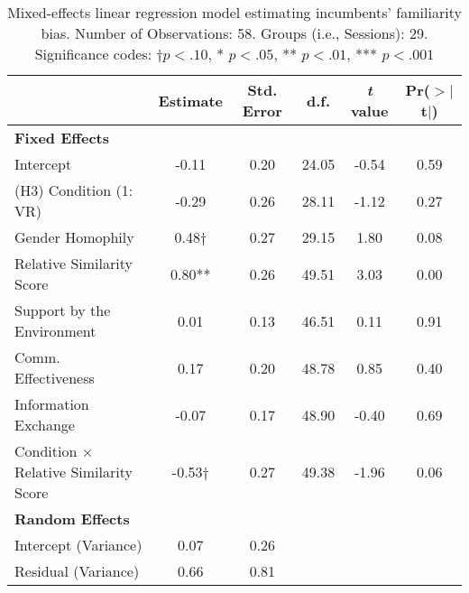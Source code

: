 \begin{table}[ht]
\centering
\small
\begin{tabular}{lccccc}
  \hline
 & Estimate & Std. Error & d.f. & \textit{t} value & Pr($>$$|$t$|$) \\ 
  \hline
  \textbf{Fixed Effects} & & & & & \\
  Intercept & -0.11 & 0.20 & 24.05 & -0.54 & 0.59 \\ 
  (H3) Condition (1: VR) & -0.29 & 0.26 & 28.11 & -1.12 & 0.27 \\ 
  Gender Homophily & 0.48$\dagger$ & 0.27 & 29.15 & 1.80 & 0.08 \\ 
  Relative Similarity Score & 0.80** & 0.26 & 49.51 & 3.03 & 0.00 \\ 
  Support by the Environment & 0.01 & 0.13 & 46.51 & 0.11 & 0.91 \\ 
  Comm. Effectiveness & 0.17 & 0.20 & 48.78 & 0.85 & 0.40 \\ 
  Information Exchange & -0.07 & 0.17 & 48.90 & -0.40 & 0.69 \\ 
  Condition $\times$ Relative Similarity Score & -0.53$\dagger$ & 0.27 & 49.38 & -1.96 & 0.06 \\ 
  \textbf{Random Effects} & & & & & \\
  Intercept (Variance) & 0.07 & 0.26 & & & \\
  Residual (Variance) & 0.66 & 0.81 & & & \\
   \hline
\end{tabular}
\caption{Mixed-effects linear regression model estimating incumbents' familiarity bias. Number of Observations: 58. Groups (i.e., Sessions): 29. Significance codes: $\dagger p < .10$,  * $p < .05$, ** $p < .01$, *** $p < .001$}
\label{tab:mixed-effect-familiarity}
\end{table}